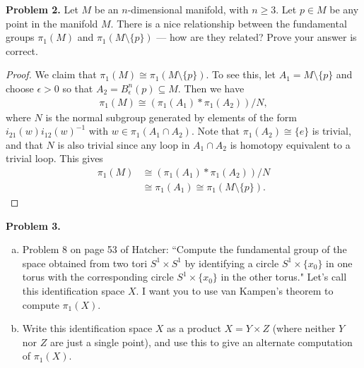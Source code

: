 \documentclass[leqno]{article}
\theoremstyle{nonumberplain}
\newtheorem{proof}{Proof}
\begin{document}
\vspace*{1cm}


\noindent\textbf{Problem 2.} Let $M$ be an $n$-dimensional manifold, with $n\ge 3$. Let $p\in M$ be any point in the manifold $M$. There is a nice relationship between the fundamental groups $\pi_1(M)$ and $\pi_1(M\setminus\{p\})$ --- how are they related? Prove your answer is correct.

\begin{proof}
We claim that $\pi_1(M) \cong \pi_1(M\setminus \{p\})$. To see this, let $A_1 = M\setminus \{p\}$ and choose $\epsilon>0$ so that $A_2 = B_{\epsilon}^n(p)\subseteq M$.  Then we have
\begin{align*}
\pi_1(M)\cong(\pi_1(A_1)\ast \pi_1(A_2))/N,
\end{align*}
where $N$ is the normal subgroup generated by elements of the form $i_{21}(w)i_{12}(w)^{-1}$ with $w\in \pi_1(A_1\cap A_2)$. Note that $\pi_1(A_2)\cong \{e\}$ is trivial, and that $N$ is also trivial since any loop in $A_1\cap A_2$ is homotopy equivalent to a trivial loop.  This gives
\begin{align*}
\pi_1(M)&\cong(\pi_1(A_1) \ast \pi_1(A_2))/N\\
&\cong \pi_1(A_1) \cong \pi_1(M\setminus \{p\}).
\end{align*}
\end{proof}

\vspace*{1cm}

\pagebreak


\noindent\textbf{Problem 3.} 
\begin{enumerate}[(a)]
\item Problem 8 on page 53 of Hatcher: ``Compute the fundamental group of the space obtained from two tori $S^1\times S^1$ by identifying a circle $S^1\times\{x_0\}$ in one torus with the corresponding circle $S^1\times\{x_0\}$ in the other torus." Let's call this identification space $X$. I want you to use van Kampen's theorem to compute $\pi_1(X)$.
\item Write this identification space $X$ as a product $X=Y\times Z$ (where neither $Y$ nor $Z$ are just a single point), and use this to give an alternate computation of $\pi_1(X)$.
\end{enumerate}
\end{document}
